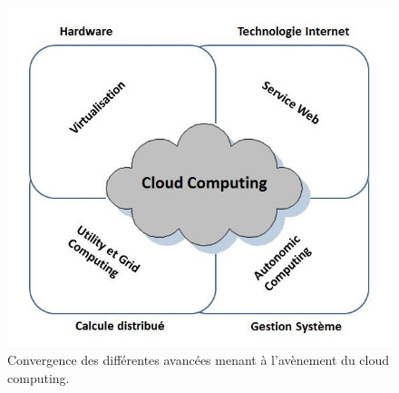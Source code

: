 \begin{figure}[H]
	\centering
	\includegraphics[width=0.5\linewidth]{images/34-0}
	\caption{ Convergence des différentes avancées menant à l'avènement du cloud computing.}
	\label{fig:34-0}
\end{figure}



